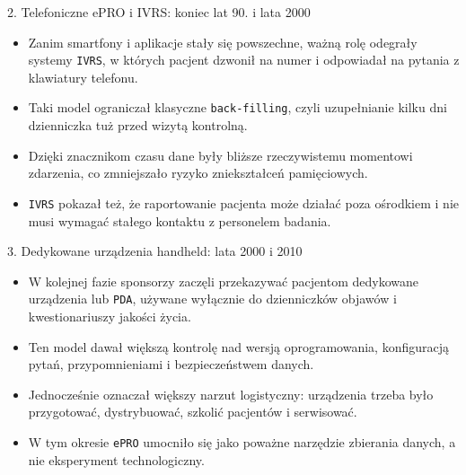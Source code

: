 \begin{frame}{2. Telefoniczne ePRO i IVRS: koniec lat 90. i lata 2000}
  \begin{itemize}
    \item Zanim smartfony i aplikacje stały się powszechne, ważną rolę odegrały systemy \texttt{IVRS}, w których pacjent dzwonił na numer i odpowiadał na pytania z klawiatury telefonu.
    \item Taki model ograniczał klasyczne \texttt{back-filling}, czyli uzupełnianie kilku dni dzienniczka tuż przed wizytą kontrolną.
    \item Dzięki znacznikom czasu dane były bliższe rzeczywistemu momentowi zdarzenia, co zmniejszało ryzyko zniekształceń pamięciowych.
    \item \texttt{IVRS} pokazał też, że raportowanie pacjenta może działać poza ośrodkiem i nie musi wymagać stałego kontaktu z personelem badania.
  \end{itemize}
\end{frame}

\begin{frame}{3. Dedykowane urządzenia handheld: lata 2000 i 2010}
  \begin{itemize}
    \item W kolejnej fazie sponsorzy zaczęli przekazywać pacjentom dedykowane urządzenia lub \texttt{PDA}, używane wyłącznie do dzienniczków objawów i kwestionariuszy jakości życia.
    \item Ten model dawał większą kontrolę nad wersją oprogramowania, konfiguracją pytań, przypomnieniami i bezpieczeństwem danych.
    \item Jednocześnie oznaczał większy narzut logistyczny: urządzenia trzeba było przygotować, dystrybuować, szkolić pacjentów i serwisować.
    \item W tym okresie \texttt{ePRO} umocniło się jako poważne narzędzie zbierania danych, a nie eksperyment technologiczny.
  \end{itemize}
\end{frame}

